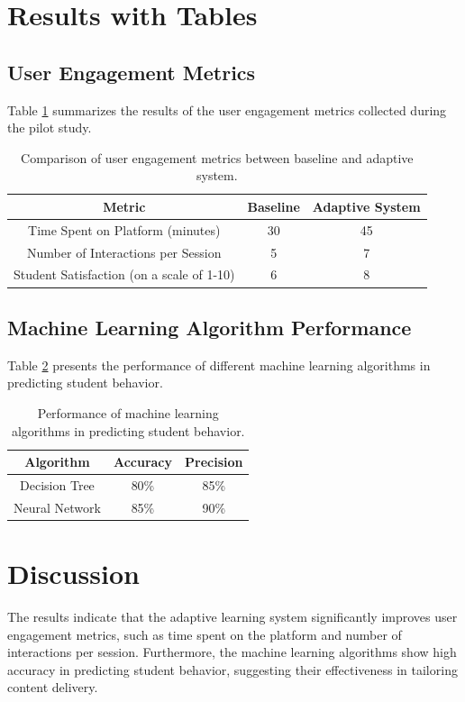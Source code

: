 \documentclass{article}
\begin{document}
\section{Results with Tables}
\subsection{User Engagement Metrics}
Table \ref{table:user_engagement} summarizes the results of the user engagement metrics collected during the pilot study.

\begin{table}[ht]
\centering
\begin{tabular}{|c|c|c|}
\hline
\textbf{Metric} & \textbf{Baseline} & \textbf{Adaptive System} \\ \hline
Time Spent on Platform (minutes) & 30 & 45 \\ \hline
Number of Interactions per Session & 5 & 7 \\ \hline
Student Satisfaction (on a scale of 1-10) & 6 & 8 \\ \hline
\end{tabular}
\caption{Comparison of user engagement metrics between baseline and adaptive system.}
\label{table:user_engagement}
\end{table}

\subsection{Machine Learning Algorithm Performance}
Table \ref{table:ml_performance} presents the performance of different machine learning algorithms in predicting student behavior.

\begin{table}[ht]
\centering
\begin{tabular}{|c|c|c|}
\hline
\textbf{Algorithm} & \textbf{Accuracy} & \textbf{Precision} \\ \hline
Decision Tree & 80\% & 85\% \\ \hline
Neural Network & 85\% & 90\% \\ \hline
\end{tabular}
\caption{Performance of machine learning algorithms in predicting student behavior.}
\label{table:ml_performance}
\end{table}

\section{Discussion}
The results indicate that the adaptive learning system significantly improves user engagement metrics, such as time spent on the platform and number of interactions per session. Furthermore, the machine learning algorithms show high accuracy in predicting student behavior, suggesting their effectiveness in tailoring content delivery.
\end{document}
